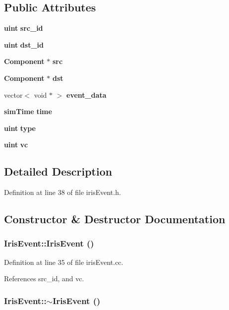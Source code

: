 \subsection*{Public Attributes}
\begin{CompactItemize}
\item 
{\bf uint} {\bf src\_\-id}
\item 
{\bf uint} {\bf dst\_\-id}
\item 
{\bf Component} $\ast$ {\bf src}
\item 
{\bf Component} $\ast$ {\bf dst}
\item 
vector$<$ void $\ast$ $>$ {\bf event\_\-data}
\item 
{\bf simTime} {\bf time}
\item 
{\bf uint} {\bf type}
\item 
{\bf uint} {\bf vc}
\end{CompactItemize}


\subsection{Detailed Description}


Definition at line 38 of file irisEvent.h.

\subsection{Constructor \& Destructor Documentation}
\subsubsection[{IrisEvent}]{\setlength{\rightskip}{0pt plus 5cm}IrisEvent::IrisEvent ()}\label{classIrisEvent_231a0a457b0f5469d17804d9ced7cc79}




Definition at line 35 of file irisEvent.cc.

References src\_\-id, and vc.
\subsubsection[{$\sim$IrisEvent}]{\setlength{\rightskip}{0pt plus 5cm}IrisEvent::$\sim$IrisEvent ()}\label{classIrisEvent_5840e399aa6f659e30dc7757e71dc28b}




